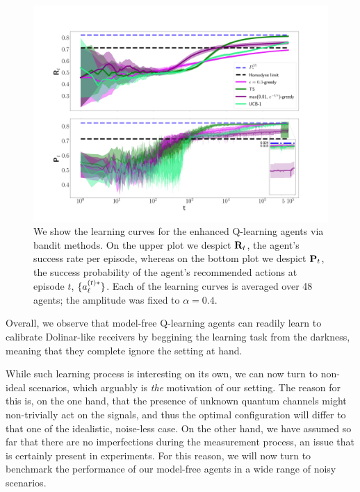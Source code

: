\begin{figure}[t!]
    \centering
    \includegraphics[width=1.\textwidth]{Figures/317/rev_enh-QLexp.png}
   \caption{We show the learning curves for the enhanced Q-learning agents via bandit methods. On the upper plot we despict $\mathbf{R}_{t}$, the agent's success rate per episode, whereas on the bottom plot we despict $\mathbf{P}_{t}$, the success probability of the agent's recommended actions at episode $t$, $\lbrace a_{\ell}^{(t)*}\rbrace$. Each of the learning curves is averaged over 48 agents; the amplitude was fixed to $\alpha = 0.4$.}
    \label{fig:threemethods}
\end{figure}

Overall, we observe that model-free Q-learning agents can readily learn to calibrate Dolinar-like receivers by beggining the learning task from the darkness, meaning that they complete ignore the setting at hand.

While such learning process is interesting on its own, we can now turn to non-ideal scenarios, which arguably is \textit{the} motivation of our setting. The reason for this is, on the one hand, that the presence of unknown quantum channels might non-trivially act on the signals, and thus the optimal configuration will differ to that one of the idealistic, noise-less case. On the other hand, we have assumed so far that there are no imperfections during the measurement process, an issue that is certainly present in experiments. For this reason, we will now turn to benchmark the performance of our model-free agents in a wide range of noisy scenarios.
